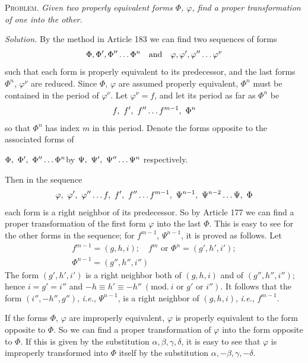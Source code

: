 \textsc{Problem.} \textit{Given two properly equivalent forms $\Phi$, $\varphi$, find a proper transformation of one into the other.}

\textit{Solution.} By the method in Article 183 we can find two sequences of forms
\[
\Phi,\Phi',\Phi''\mathinner{\ldotp\ldotp\ldotp}\Phi^n\quad\text{and}\quad\varphi,\varphi',\varphi''\mathinner{\ldotp\ldotp\ldotp}\varphi^\nu
\]
such that each form is properly equivalent to its predecessor, and the last forms $\Phi^n$, $\varphi^\nu$ are reduced. Since $\Phi$, $\varphi$ are assumed properly equivalent, $\Phi^n$ must be contained in the period of $\varphi^\nu$. Let $\varphi^\nu=f$, and let its period as far as $\Phi^n$ be
\[
f,\ f',\ f''\mathinner{\ldotp\ldotp\ldotp} f^{m-1},\ \Phi^n
\]
so that $\Phi^n$ has index $m$ in this period. Denote the forms opposite to the associated forms of
\begin{center}
$\Phi,\ \Phi',\ \Phi''\mathinner{\ldotp\ldotp\ldotp}\Phi^n$\quad by $\Psi,\ \Psi',\ \Psi''\mathinner{\ldotp\ldotp\ldotp}\Psi^n$ respectively.
\end{center}
Then in the sequence
\[
\varphi,\ \varphi',\ \varphi''\mathinner{\ldotp\ldotp\ldotp} f,\ f',\ f''\mathinner{\ldotp\ldotp\ldotp} f^{m-1},\ \Psi^{n-1},\ \Psi^{n-2}\mathinner{\ldotp\ldotp\ldotp}\Psi,\ \Phi
\]
each form is a right neighbor of its predecessor. So by Article 177 we can find a proper transformation of the first form $\varphi$ into the last $\Phi$. This is easy to see for the other forms in the sequence; for $f^{m-1}$, $\Psi^{n-1}$, it is proved as follows. Let
\[
\begin{gathered}f^{m-1}=(g,h,i);\quad f^m\text{ or }\Phi^n=(g',h',i');\\ \Phi^{n-1}=(g'',h'',i'')\end{gathered}
\]
The form $(g',h',i')$ is a right neighbor both of $(g,h,i)$ and of $(g'',h'',i'')$; hence $i=g'=i''$ and $-h\equiv h'\equiv-h''\ (\mathrm{mod.}\ i\text{ or }g'\text{ or }i'')$. It follows that the form $(i'',-h'',g'')$, \textit{i.e.}, $\Psi^{n-1}$, is a right neighbor of $(g,h,i)$, \textit{i.e.}, $f^{m-1}$.

If the forms $\Phi$, $\varphi$ are improperly equivalent, $\varphi$ is properly equivalent to the form opposite to $\Phi$. So we can find a proper transformation of $\varphi$ into the form opposite to $\Phi$. If this is given by the substitution $\alpha,\beta,\gamma,\delta$, it is easy to see that $\varphi$ is improperly transformed into $\Phi$ itself by the substitution $\alpha,-\beta,\gamma,-\delta$.

